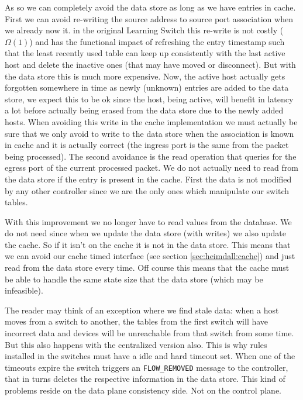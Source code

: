 As so we can completely avoid the data store as long as we have
entries in cache.
First we can avoid re-writing the source address to source port association when we already now it.
in the original Learning Switch this re-write is not costly
($\Omega(1)$) and has the functional impact of refreshing the entry
timestamp such that the least recently used table can keep up
consistently with the last active host and delete the inactive ones
(that may have moved or disconnect). But with the data store this is
much more expensive. 
Now, the active host
actually gets forgotten somewhere in time as newly (unknown) entries
are added to the data store, we expect this to be ok since the host,
being active, will benefit in latency a lot before actually being
erased from the data store due to the newly added hosts. 
When avoiding this write in the cache implementation we must actually be sure that we only
avoid to write to the data store when the association is known in
cache and it is actually correct (the ingress port is the same from
the packet being processed). 
The second avoidance is the read operation that queries for the egress
port of the current processed packet. We do not actually need to read
from the data store if the entry is present in the cache. First the
data is not modified by any other controller since we are the only
ones which manipulate our switch tables. 

With this improvement we no longer have to read values from the
database. We do not need since when we update the data store  (with
writes) we also update the cache. So if it isn't on the cache it is not in the
data store. This means that we can avoid our cache timed interface
(see section \ref{sec:heimdall:cache}) and just read from the data
store every time. Off course this means that the cache must be able to
handle the same state size that the data store (which may be
infeasible). 

The reader may think of an exception where we find stale data:
when a host moves from a switch to another, the tables from the first
switch will have  incorrect data and devices will be unreachable from
that switch from some time. But this also happens with the centralized
version also. This is why rules installed in the switches must have a
idle and hard timeout set. When one of the timeouts expire the switch
triggers an \texttt{FLOW\_REMOVED} message to the controller, that in
turns deletes the respective information in the data store.  This kind
of problems reside on the data plane consistency side. Not on the
control plane. 




